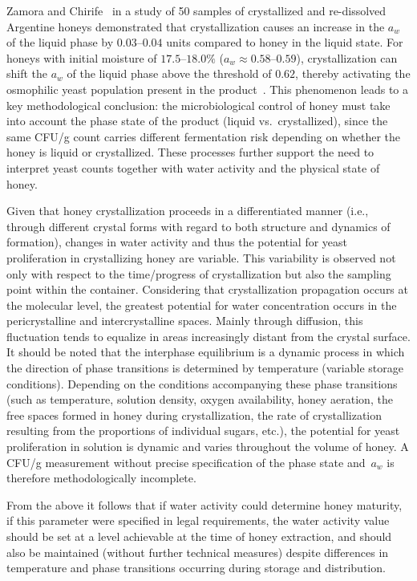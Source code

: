 Zamora and Chirife~\cite{zamora2006} in a study of 50 samples
of crystallized and re-dissolved Argentine honeys demonstrated
that crystallization causes an increase in the $a_w$ of the liquid
phase by $0.03$--$0.04$ units compared to honey in the liquid
state. For honeys with initial moisture of $17.5$--$18.0\%$
($a_w \approx 0.58$--$0.59$), crystallization can shift the
$a_w$ of the liquid phase above the threshold of $0.62$, thereby
activating the osmophilic yeast population present in the
product~\cite{zamora2006,ijfans2019}.
This phenomenon leads to a key methodological conclusion: the
microbiological control of honey must take into account the phase
state of the product (liquid vs.\ crystallized), since the same
CFU/g count carries different fermentation risk depending on whether
the honey is liquid or crystallized. These processes further support the need to interpret yeast counts together with water activity and the physical state of honey.

Given that honey crystallization proceeds in a differentiated
manner (i.e., through different crystal forms with regard to both
structure and dynamics of formation), changes in water activity
and thus the potential for yeast proliferation in crystallizing
honey are variable. This variability is observed not only with
respect to the time/progress of crystallization but also the
sampling point within the container. Considering that crystallization
propagation occurs at the molecular level, the greatest potential
for water concentration occurs in the pericrystalline and
intercrystalline spaces. Mainly through diffusion, this fluctuation
tends to equalize in areas increasingly distant from the crystal
surface. It should be noted that the interphase equilibrium is a
dynamic process in which the direction of phase transitions is
determined by temperature (variable storage conditions). Depending
on the conditions accompanying these phase transitions (such as
temperature, solution density, oxygen availability, honey aeration,
the free spaces formed in honey during crystallization, the rate of
crystallization resulting from the proportions of individual sugars,
etc.), the potential for yeast proliferation in solution is dynamic
and varies throughout the volume of honey. A CFU/g measurement
without precise specification of the phase state and~$a_w$ is
therefore methodologically incomplete.

From the above it follows that if water activity could determine
honey maturity, if this parameter were specified in legal
requirements, the water activity value should be set at a level
achievable at the time of honey extraction, and should also be
maintained (without further technical measures) despite differences
in temperature and phase transitions occurring during storage and
distribution.

